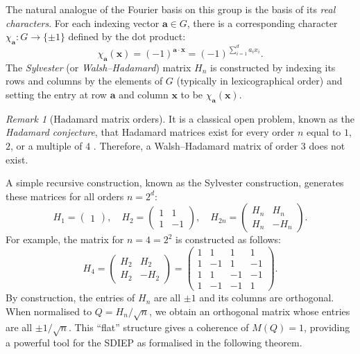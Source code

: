\documentclass[12pt,fleqn]{amsart}
\theoremstyle{definition}
\theoremstyle{remark}
\newtheorem{rem}[thm]{Remark}
\newcommand{\1}{\mathbf{1}}
\begin{document}
The natural analogue of the Fourier basis on this group is the basis of its \emph{real characters}. For each indexing vector $\mathbf{a}\in G$, there is a corresponding character $\chi_{\mathbf{a}}:G\to\{\pm1\}$ defined by the dot product:
\[
\chi_{\mathbf{a}}(\mathbf{x}) = (-1)^{\mathbf{a}\cdot\mathbf{x}} = (-1)^{\sum_{i=1}^d a_i x_i}.
\]
The \emph{Sylvester} (or \emph{Walsh--Hadamard}) matrix $H_n$ is constructed by indexing its rows and columns by the elements of $G$ (typically in lexicographical order) and setting the entry at row $\mathbf{a}$ and column $\mathbf{x}$ to be $\chi_{\mathbf{a}}(\mathbf{x})$.
\

\begin{rem}[Hadamard matrix orders]
It is a classical open problem, known as the \emph{Hadamard conjecture}, that Hadamard matrices exist for every order $n$ equal to $1$, $2$, or a multiple of $4$ \cite{HedayatWallis}. Therefore, a Walsh--Hadamard matrix of order $3$ does not exist.
\end{rem}

A simple recursive construction, known as the Sylvester construction, generates these matrices for all orders $n=2^d$:
\[
H_1 = \begin{pmatrix} 1 \end{pmatrix}, \quad H_2 = \begin{pmatrix} 1 & 1 \\ 1 & -1 \end{pmatrix}, \quad H_{2n} = \begin{pmatrix} H_n & H_n \\ H_n & -H_n \end{pmatrix}.
\]
For example, the matrix for $n=4=2^2$ is constructed as follows:
\[
H_4 = \begin{pmatrix} H_2 & H_2 \\ H_2 & -H_2 \end{pmatrix} = 
\left(\begin{array}{cc|cc}
1 & 1 & 1 & 1 \\
1 & -1 & 1 & -1 \\\hline
1 & 1 & -1 & -1 \\
1 & -1 & -1 & 1
\end{array}\right).
\]
By construction, the entries of $H_n$ are all $\pm 1$ and its columns are orthogonal. When normalised to $Q = H_n/\sqrt{n}$, we obtain an orthogonal matrix whose entries are all $\pm 1/\sqrt{n}$. This ``flat'' structure gives a coherence of $M(Q)=1$, providing a powerful tool for the SDIEP as formalised in the following theorem.
\end{document}
